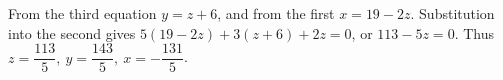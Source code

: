 From the third equation $ y=z+6 $, and from the first $ x=19-2z $. Substitution into the second gives $ 5(19-2z)+3(z+6)+2z=0 $, or $ 113-5z=0 $. Thus $\boxed{z=\dfrac{113}{5},\ y=\dfrac{143}{5},\ x=-\dfrac{131}{5}}$.
